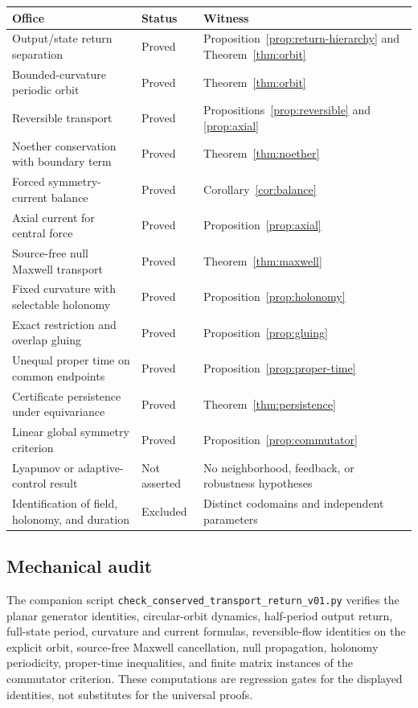 \documentclass[11pt,letterpaper]{article}
\theoremstyle{dynamicsstyle}
\begin{document}
\small
\begin{tabularx}{\textwidth}{@{}>{\raggedright\arraybackslash}X
                                  >{\raggedright\arraybackslash}p{}
                                  >{\raggedright\arraybackslash}p{}@{}}
\toprule
Office & Status & Witness\\
\midrule
Output/state return separation
& Proved & Proposition~\ref{prop:return-hierarchy} and Theorem~\ref{thm:orbit}\\
Bounded-curvature periodic orbit
& Proved & Theorem~\ref{thm:orbit}\\
Reversible transport
& Proved & Propositions~\ref{prop:reversible} and \ref{prop:axial}\\
Noether conservation with boundary term
& Proved & Theorem~\ref{thm:noether}\\
Forced symmetry-current balance
& Proved & Corollary~\ref{cor:balance}\\
Axial current for central force
& Proved & Proposition~\ref{prop:axial}\\
Source-free null Maxwell transport
& Proved & Theorem~\ref{thm:maxwell}\\
Fixed curvature with selectable holonomy
& Proved & Proposition~\ref{prop:holonomy}\\
Exact restriction and overlap gluing
& Proved & Proposition~\ref{prop:gluing}\\
Unequal proper time on common endpoints
& Proved & Proposition~\ref{prop:proper-time}\\
Certificate persistence under equivariance
& Proved & Theorem~\ref{thm:persistence}\\
Linear global symmetry criterion
& Proved & Proposition~\ref{prop:commutator}\\
Lyapunov or adaptive-control result
& Not asserted & No neighborhood, feedback, or robustness hypotheses\\
Identification of field, holonomy, and duration
& Excluded & Distinct codomains and independent parameters\\
\bottomrule
\end{tabularx}
\normalsize

\subsection*{Mechanical audit}
The companion script \texttt{check\_conserved\_transport\_return\_v01.py} verifies the planar generator identities, circular-orbit dynamics, half-period output return, full-state period, curvature and current formulas, reversible-flow identities on the explicit orbit, source-free Maxwell cancellation, null propagation, holonomy periodicity, proper-time inequalities, and finite matrix instances of the commutator criterion.  These computations are regression gates for the displayed identities, not substitutes for the universal proofs.
\end{document}

